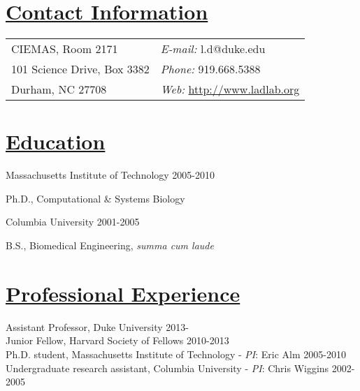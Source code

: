 \documentclass[overlapped,line,11pt]{res}
\newenvironment{list1}{
  \begin{list}{\ding{113}}{%
      \setlength{\itemsep}{0in}
      \setlength{\parsep}{0in} \setlength{\parskip}{0in}
      \setlength{\topsep}{0in} \setlength{\partopsep}{0in} 
      \setlength{\leftmargin}{0.17in}}}{\end{list}}
\begin{document}
\setlength{\pdfpageheight}{\paperheight}
\setlength{\pdfpagewidth}{\paperwidth}


\begin{resume}
\section{\underline{\sc Contact Information}}
\vspace{.05in}
\begin{tabular}{@{}p{4in}p{4in}}

CIEMAS, Room 2171     & {\it E-mail:}    l.d@duke.edu \\                
101 Science Drive, Box 3382   & {\it Phone:} 919.668.5388 \\
Durham, NC 27708 & {\it Web:} \url{http://www.ladlab.org} 

\end{tabular}

\section{\underline{\sc Education}}
\vspace{.05in}
Massachusetts Institute of Technology
\hfill 2005-2010\\

\vspace*{-5mm}
\begin{list1}
\item[] Ph.D., Computational \& Systems Biology
\end{list1}

\vspace*{-2.5mm}
Columbia University \hfill 2001-2005\\
\vspace*{-5mm}
\begin{list1}
\item[] B.S., Biomedical Engineering, \emph{summa cum laude}
\end{list1}

\section{\underline{\sc Professional Experience}}
\vspace{.05in}
Assistant Professor, Duke University \hfill 2013-\hspace{7.5mm} \\
Junior Fellow, Harvard Society of Fellows \hfill 2010-2013\\
Ph.D. student, Massachusetts Institute of Technology - \emph{PI}: Eric Alm \hfill
2005-2010 \\
Undergraduate research assistant, Columbia University - \emph{PI}: Chris Wiggins
\hfill 2002-2005 


\end{resume}
\end{document}
